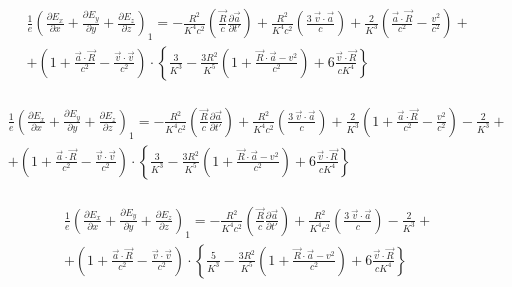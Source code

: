 \documentclass[11pt]{article}
\begin{document}
\[\begin{align}
  & \frac{1}{e}{{\left( \frac{\partial {{E}_{x}}}{\partial x}+\frac{\partial {{E}_{y}}}{\partial y}+\frac{\partial {{E}_{z}}}{\partial z} \right)}_{1}}=-\frac{{{R}^{2}}}{{{K}^{4}}{{c}^{2}}}\left( \frac{\overrightarrow{R}}{c}\frac{\partial \overrightarrow{a}}{\partial t'} \right)+\frac{{{R}^{2}}}{{{K}^{4}}{{c}^{2}}}\left( \frac{3\ \overrightarrow{v}\cdot \overrightarrow{a}}{c} \right)+\frac{2}{{{K}^{3}}}\left( \frac{\overrightarrow{a}\cdot \overrightarrow{R}}{{{c}^{2}}}-\frac{{{v}^{2}}}{{{c}^{2}}} \right)+ \\
 & +\left( 1+\frac{\overrightarrow{a}\cdot \overrightarrow{R}}{{{c}^{2}}}-\frac{\overrightarrow{v}\cdot \overrightarrow{v}}{{{c}^{2}}} \right)\cdot \left\{ \frac{3}{{{K}^{3}}}-\frac{3{{R}^{2}}}{{{K}^{5}}}\left( 1+\frac{\overrightarrow{R}\cdot \overrightarrow{a}-{{v}^{2}}}{{{c}^{2}}} \right)+6\frac{\overrightarrow{v}\cdot \overrightarrow{R}}{c{{K}^{4}}} \right\} \\
\end{align}\]

\[\begin{align}
  & \frac{1}{e}{{\left( \frac{\partial {{E}_{x}}}{\partial x}+\frac{\partial {{E}_{y}}}{\partial y}+\frac{\partial {{E}_{z}}}{\partial z} \right)}_{1}}=-\frac{{{R}^{2}}}{{{K}^{4}}{{c}^{2}}}\left( \frac{\overrightarrow{R}}{c}\frac{\partial \overrightarrow{a}}{\partial t'} \right)+\frac{{{R}^{2}}}{{{K}^{4}}{{c}^{2}}}\left( \frac{3\ \overrightarrow{v}\cdot \overrightarrow{a}}{c} \right)+\frac{2}{{{K}^{3}}}\left( 1+\frac{\overrightarrow{a}\cdot \overrightarrow{R}}{{{c}^{2}}}-\frac{{{v}^{2}}}{{{c}^{2}}} \right)-\frac{2}{{{K}^{3}}}+ \\
 & +\left( 1+\frac{\overrightarrow{a}\cdot \overrightarrow{R}}{{{c}^{2}}}-\frac{\overrightarrow{v}\cdot \overrightarrow{v}}{{{c}^{2}}} \right)\cdot \left\{ \frac{3}{{{K}^{3}}}-\frac{3{{R}^{2}}}{{{K}^{5}}}\left( 1+\frac{\overrightarrow{R}\cdot \overrightarrow{a}-{{v}^{2}}}{{{c}^{2}}} \right)+6\frac{\overrightarrow{v}\cdot \overrightarrow{R}}{c{{K}^{4}}} \right\} \\
\end{align}\]

\[\begin{align}
  & \frac{1}{e}{{\left( \frac{\partial {{E}_{x}}}{\partial x}+\frac{\partial {{E}_{y}}}{\partial y}+\frac{\partial {{E}_{z}}}{\partial z} \right)}_{1}}=-\frac{{{R}^{2}}}{{{K}^{4}}{{c}^{2}}}\left( \frac{\overrightarrow{R}}{c}\frac{\partial \overrightarrow{a}}{\partial t'} \right)+\frac{{{R}^{2}}}{{{K}^{4}}{{c}^{2}}}\left( \frac{3\ \overrightarrow{v}\cdot \overrightarrow{a}}{c} \right)-\frac{2}{{{K}^{3}}}+ \\
 & +\left( 1+\frac{\overrightarrow{a}\cdot \overrightarrow{R}}{{{c}^{2}}}-\frac{\overrightarrow{v}\cdot \overrightarrow{v}}{{{c}^{2}}} \right)\cdot \left\{ \frac{5}{{{K}^{3}}}-\frac{3{{R}^{2}}}{{{K}^{5}}}\left( 1+\frac{\overrightarrow{R}\cdot \overrightarrow{a}-{{v}^{2}}}{{{c}^{2}}} \right)+6\frac{\overrightarrow{v}\cdot \overrightarrow{R}}{c{{K}^{4}}} \right\} \\
\end{align}\]
\end{document}

